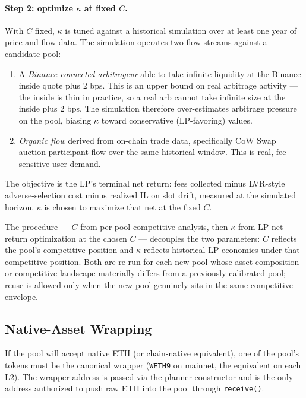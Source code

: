 \documentclass[11pt]{article}
\begin{document}
\paragraph{Step 2: optimize $\kappa$ at fixed $C$.}
With $C$ fixed, $\kappa$ is tuned against a historical simulation over
at least one year of price and flow data. The simulation operates two flow streams against a candidate
pool:

\begin{enumerate}
  \item A \emph{Binance-connected arbitrageur} able to take infinite
        liquidity at the Binance inside quote plus 2 bps. This is an
        upper bound on real arbitrage activity --- the inside is thin in
        practice, so a real arb cannot take infinite size at the inside
        plus 2 bps. The simulation therefore over-estimates arbitrage
        pressure on the pool, biasing $\kappa$ toward conservative
        (LP-favoring) values.
  \item \emph{Organic flow} derived from on-chain trade data, specifically
        CoW Swap auction participant flow over the same historical window.
        This is real, fee-sensitive user demand.
\end{enumerate}

The objective is the LP's terminal net return: fees collected minus
LVR-style adverse-selection cost minus realized IL on slot drift, measured
at the simulated horizon. $\kappa$ is chosen to maximize that net at the
fixed $C$.

The procedure --- $C$ from per-pool competitive analysis, then $\kappa$
from LP-net-return optimization at the chosen $C$ --- decouples the two
parameters: $C$ reflects the pool's competitive position and $\kappa$
reflects historical LP economics under that competitive position. Both
are re-run for each new pool whose asset composition or competitive
landscape materially differs from a previously calibrated pool; reuse is
allowed only when the new pool genuinely sits in the same competitive
envelope.

\subsection{Native-Asset Wrapping}

If the pool will accept native ETH (or chain-native equivalent), one of the
pool's tokens must be the canonical wrapper (\texttt{WETH9} on mainnet, the
equivalent on each L2). The wrapper address is passed via the planner
constructor and is the only address authorized to push raw ETH into the pool
through \texttt{receive()}.
\end{document}
